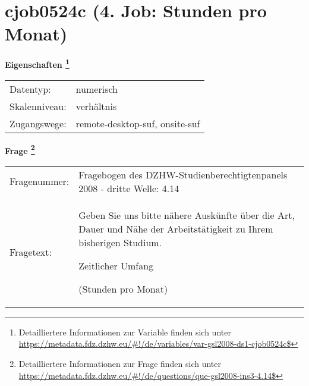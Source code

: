 
    \setcounter{footnote}{0}

    \vspace*{-1.8cm}
	\section{cjob0524c (4. Job: Stunden pro Monat)}
	\label{section:cjob0524c}



    \vspace*{0.5cm}
    \noindent\textbf{Eigenschaften
	\footnote{Detailliertere Informationen zur Variable finden sich unter
		\url{https://metadata.fdz.dzhw.eu/\#!/de/variables/var-gsl2008-ds1-cjob0524c$}}}\\
	\begin{tabularx}{\hsize}{@{}lX}
	Datentyp: & numerisch \\
	Skalenniveau: & verhältnis \\
	Zugangswege: &
	  remote-desktop-suf, 
	  onsite-suf
 \\
    \end{tabularx}



				\vspace*{0.5cm}
                \noindent\textbf{Frage
	                \footnote{Detailliertere Informationen zur Frage finden sich unter
		              \url{https://metadata.fdz.dzhw.eu/\#!/de/questions/que-gsl2008-ins3-4.14$}}}\\
				\begin{tabularx}{\hsize}{@{}lX}
					Fragenummer: &
					  Fragebogen des DZHW-Studienberechtigtenpanels 2008 - dritte Welle:
					  4.14
 \\
					Fragetext: & Geben Sie uns bitte nähere Auskünfte über die Art, Dauer und Nähe der Arbeitstätigkeit zu Ihrem bisherigen Studium.\par  Zeitlicher Umfang\par  (Stunden pro Monat) \\
				\end{tabularx}





